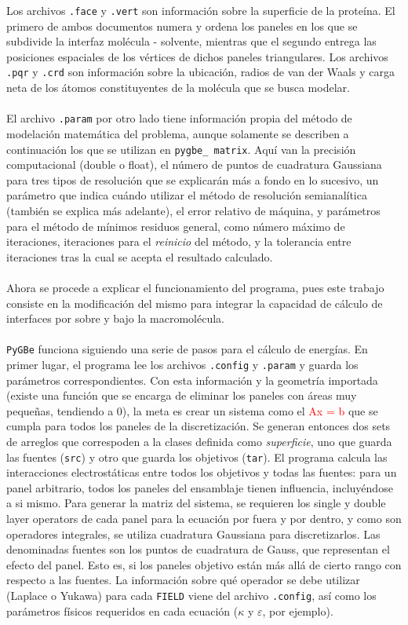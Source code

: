 \documentclass[12pt, oneside, numbers, spanish]{ezthesis}
\numberwithin{equation}{section}
\begin{document}
Los archivos \texttt{.face} y \texttt{.vert} son información sobre la superficie de la proteína. El primero de ambos documentos numera y ordena los paneles en los que se subdivide la interfaz molécula - solvente, mientras que el segundo entrega las posiciones espaciales de los vértices de dichos paneles triangulares. Los archivos \texttt{.pqr} y \texttt{.crd} son información sobre la ubicación, radios de van der Waals y carga neta de los átomos constituyentes de la molécula que se busca modelar.\\\\
El archivo \texttt{.param} por otro lado tiene información propia del método de modelación matemática del problema, aunque solamente se describen a continuación los que se utilizan en \texttt{pygbe\_ matrix}. Aquí van la precisión computacional (double o float), el número de puntos de cuadratura Gaussiana para tres tipos de resolución que se explicarán más a fondo en lo sucesivo, un parámetro que indica cuándo utilizar el método de resolución semianalítica (también se explica más adelante), el error relativo de máquina, y parámetros para el método de mínimos residuos general, como número máximo de iteraciones, iteraciones para el \textit{reinicio} del método, y la tolerancia entre iteraciones tras la cual se acepta el resultado calculado.\\\\
Ahora se procede a explicar el funcionamiento del programa, pues este trabajo consiste en la modificación del mismo para integrar la capacidad de cálculo de interfaces por sobre y bajo la macromolécula.\\\\
\texttt{PyGBe} funciona siguiendo una serie de pasos para el cálculo de energías. En primer lugar, el programa lee los archivos \texttt{.config} y \texttt{.param} y guarda los parámetros correspondientes. Con esta información y la geometría importada (existe una función que se encarga de eliminar los paneles con áreas muy pequeñas, tendiendo a 0), la meta es crear un sistema como el \textcolor{red}{Ax = b} que se cumpla para todos los paneles de la discretización. Se generan entonces dos sets de arreglos que correspoden a la clases definida como \textit{superficie}, uno que guarda las fuentes (\texttt{src}) y otro que guarda los objetivos (\texttt{tar}). El programa calcula las interacciones electrostáticas entre todos los objetivos y todas las fuentes: para un panel arbitrario, todos los paneles del ensamblaje tienen influencia, incluyéndose a si mismo. Para generar la matriz del sistema, se requieren los single y double layer operators de cada panel para la ecuación por fuera y por dentro, y como son operadores integrales, se utiliza cuadratura Gaussiana para discretizarlos. Las denominadas fuentes son los puntos de cuadratura de Gauss, que representan el efecto del panel. Esto es, si los paneles objetivo están más allá de cierto rango con respecto a las fuentes. La información sobre qué operador se debe utilizar (Laplace o Yukawa) para cada \texttt{FIELD} viene del archivo \texttt{.config}, así como los parámetros físicos requeridos en cada ecuación ($\kappa$ y $\varepsilon$, por ejemplo).\\\\
\end{document}
